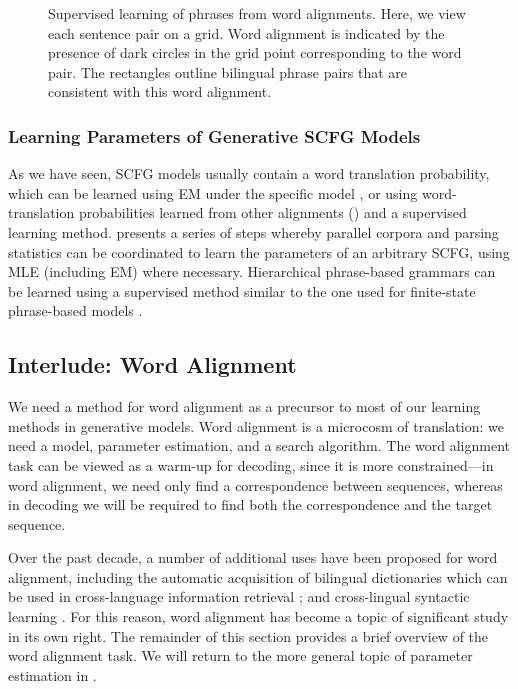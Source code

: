 \figpreamble
\begin{figure*}[t]
\figfontsize{\begin{center}

\end{center}}
\figpostamble
\caption[Supervised learning of phrases from word alignments.]{\label{fig:phrase-learning}Supervised learning
of phrases from word alignments.  Here, we view each 
sentence pair on a grid.  Word alignment is indicated
by the presence of dark circles in the grid point
corresponding to the word pair.  The rectangles 
outline bilingual phrase pairs that are consistent 
with this word alignment. }
\end{figure*}


\subsubsection{Learning Parameters of Generative
SCFG Models}\label{sec:hierarchical-estimation}
As we have seen, SCFG models usually contain
a word translation probability, which can be learned
using EM under the specific model \citep{Wu:1996:acl,Yamada:2001:acl},
or using word-translation probabilities learned from
other alignments () and
a supervised learning method. \citet{Melamed:2004:acl:smtbyp}
presents a series of steps whereby parallel corpora
and parsing statistics can be coordinated to learn the parameters
of an arbitrary SCFG, using MLE (including EM) where 
necessary.  Hierarchical phrase-based grammars
can be learned using a supervised method similar
to the one used for finite-state phrase-based models
\citep{Chiang:2007:cl,Chiang:2005:acl}.


\subsection{Interlude: Word Alignment}\label{sec:word-alignment}

We need a method for word alignment as a precursor to most of
our learning methods in generative models.
Word alignment is a microcosm of
translation: we need a model, parameter estimation, and a
search algorithm.  The word alignment task can be viewed as a warm-up
for decoding, since it is more constrained---in word alignment,
we need only find a correspondence between sequences, whereas in
decoding we will be required to find both the correspondence and
the target sequence.  

Over the past decade, a number of additional 
uses have been proposed for word alignment, including the automatic
acquisition of bilingual dictionaries \citep{Melamed:1996:amta}
which can be used in cross-language information retrieval 
\citep{Wang:2005:thesis}; and cross-lingual syntactic learning
\citep{Yarowsky:2001:hlt,Hwa:2005:nle,Smith:2004:emnlp}.  
For this reason, word alignment
has become a topic of significant study in its own
right.  The remainder of this section provides a brief
overview of the word alignment task.  We will return to 
the more general topic of parameter estimation in 
.

